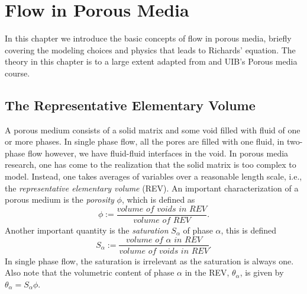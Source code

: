 \documentclass[../Main/main.tex]{subfiles}
\begin{document}
\graphicspath{{../Flow in porous media/figs/}}
\chapter{Flow in Porous Media}
\label{chap:porous media}
In this chapter we introduce the basic concepts of flow in porous media, briefly covering the modeling choices and physics that leads to Richards' equation. The theory in this chapter is to a large extent adapted from \cite{Nordbotten} and UIB's Porous media course.
\section{The Representative Elementary Volume}\label{REV}
A porous medium consists of a solid matrix and some void filled with fluid of one or more phases. In single phase flow, all the pores are filled with one fluid, in two-phase flow however, we have fluid-fluid interfaces in the void. In porous media research, one has come to the realization that the solid matrix is too complex to model. Instead, one takes averages of variables over a reasonable length scale, i.e., the \emph{representative elementary volume} (REV).
An important characterization of a porous medium is the \emph{porosity} $\phi$, which is defined as 
\begin{equation}
	\phi := \frac{\textit{volume of voids in REV}}{\textit{volume of REV}}.
\end{equation}
Another important quantity is the \emph{saturation} $S_{\alpha}$ of phase $\alpha$,  this is defined 
\begin{equation}
	S_{\alpha} := \frac{\textit{volume of }\alpha \textit{ in REV}}{\textit{volume of voids in REV}}.
\end{equation}
In single phase flow, the saturation is irrelevant as the saturation is always one. Also note that the volumetric content of phase $\alpha$ in the REV, $\theta_{\alpha}$, is given by $\theta_{\alpha} = S_{\alpha} \phi$.
\end{document}
